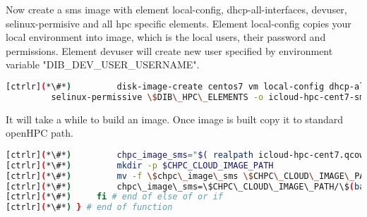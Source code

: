 Now create a sms image with element local-config, dhcp-all-interfaces, devuser, selinux-permisive and all hpc specific elements. Element local-config copies your local environment into image, which is the local users, their password and permissions. Element devuser will create new user specified by environment variable "DIB\_DEV\_USER\_USERNAME". 


\begin{lstlisting}[language=bash,keywords={}]
[ctrlr](*\#*)         disk-image-create centos7 vm local-config dhcp-all-interfaces devuser \
         selinux-permissive \$DIB\_HPC\_ELEMENTS -o icloud-hpc-cent7-sms
\end{lstlisting} 

It will take a while to build an image. Once image is built copy it to standard openHPC path.


\begin{lstlisting}[language=bash,keywords={}]
[ctrlr](*\#*)         chpc_image_sms="$( realpath icloud-hpc-cent7.qcow2)"
[ctrlr](*\#*)         mkdir -p $CHPC_CLOUD_IMAGE_PATH
[ctrlr](*\#*)         mv -f \$chpc\_image\_sms \$CHPC\_CLOUD\_IMAGE\_PATH
[ctrlr](*\#*)         chpc\_image\_sms=\$CHPC\_CLOUD\_IMAGE\_PATH/\$(basename \$chpc\_image\_sms)
[ctrlr](*\#*)     fi # end of else of or if
[ctrlr](*\#*) } # end of function
\end{lstlisting} 
